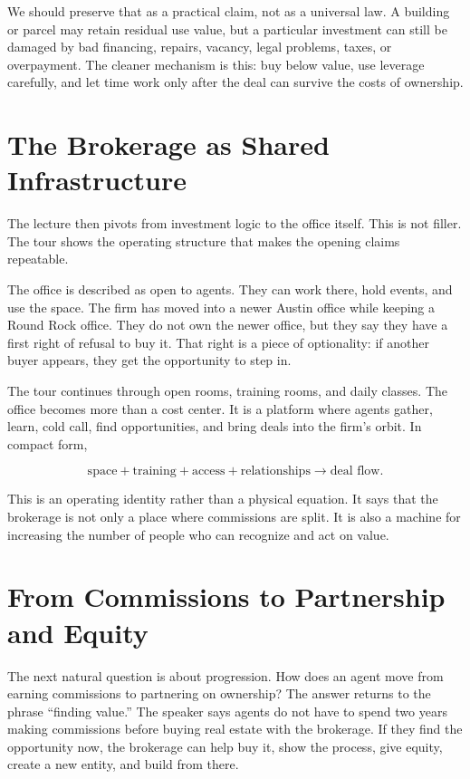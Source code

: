 We should preserve that as a practical claim, not as a universal law. A building or parcel may retain residual use value, but a particular investment can still be damaged by bad financing, repairs, vacancy, legal problems, taxes, or overpayment. The cleaner mechanism is this: buy below value, use leverage carefully, and let time work only after the deal can survive the costs of ownership.

\section{The Brokerage as Shared Infrastructure}

The lecture then pivots from investment logic to the office itself. This is not filler. The tour shows the operating structure that makes the opening claims repeatable.

The office is described as open to agents. They can work there, hold events, and use the space. The firm has moved into a newer Austin office while keeping a Round Rock office. They do not own the newer office, but they say they have a first right of refusal to buy it. That right is a piece of optionality: if another buyer appears, they get the opportunity to step in.

The tour continues through open rooms, training rooms, and daily classes. The office becomes more than a cost center. It is a platform where agents gather, learn, cold call, find opportunities, and bring deals into the firm's orbit. In compact form,

\begin{equation}
\text{space}+\text{training}+\text{access}+\text{relationships}
\longrightarrow
\text{deal flow}.
\end{equation}

This is an operating identity rather than a physical equation. It says that the brokerage is not only a place where commissions are split. It is also a machine for increasing the number of people who can recognize and act on value.

\section{From Commissions to Partnership and Equity}

The next natural question is about progression. How does an agent move from earning commissions to partnering on ownership? The answer returns to the phrase ``finding value.'' The speaker says agents do not have to spend two years making commissions before buying real estate with the brokerage. If they find the opportunity now, the brokerage can help buy it, show the process, give equity, create a new entity, and build from there.

